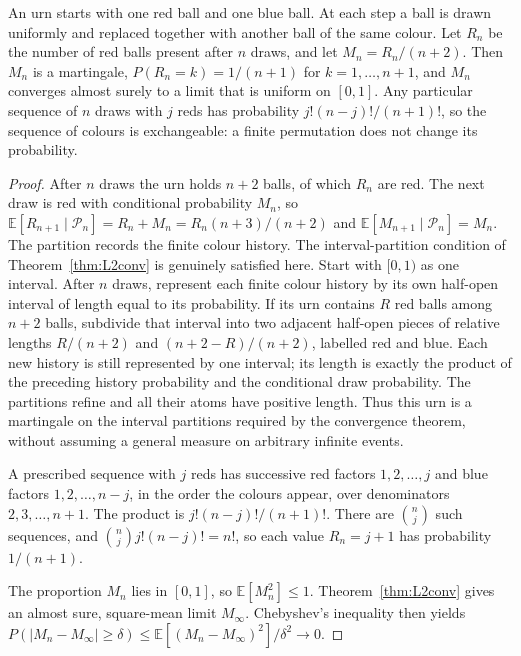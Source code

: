 \begin{theorem}\label{thm:polyaurn}
An urn starts with one red ball and one blue ball. At each step a ball is drawn uniformly and replaced together with another ball of the same colour. Let $R_n$ be the number of red balls present after $n$ draws, and let $M_n=R_n/(n+2)$. Then $M_n$ is a martingale, $P(R_n=k)=1/(n+1)$ for $k=1,\ldots,n+1$, and $M_n$ converges almost surely to a limit that is uniform on $[0,1]$. Any particular sequence of $n$ draws with $j$ reds has probability $j!(n-j)!/(n+1)!$, so the sequence of colours is exchangeable: a finite permutation does not change its probability.
\end{theorem}
\begin{proof}
After $n$ draws the urn holds $n+2$ balls, of which $R_n$ are red. The next draw is red with conditional probability $M_n$, so $\mathbb E[R_{n+1}\mid\mathcal P_n]=R_n+M_n=R_n(n+3)/(n+2)$ and $\mathbb E[M_{n+1}\mid\mathcal P_n]=M_n$. The partition records the finite colour history. The interval-partition condition of Theorem~\ref{thm:L2conv} is genuinely satisfied here. Start with $[0,1)$ as one interval. After $n$ draws, represent each finite colour history by its own half-open interval of length equal to its probability. If its urn contains $R$ red balls among $n+2$ balls, subdivide that interval into two adjacent half-open pieces of relative lengths $R/(n+2)$ and $(n+2-R)/(n+2)$, labelled red and blue. Each new history is still represented by one interval; its length is exactly the product of the preceding history probability and the conditional draw probability. The partitions refine and all their atoms have positive length. Thus this urn is a martingale on the interval partitions required by the convergence theorem, without assuming a general measure on arbitrary infinite events.

A prescribed sequence with $j$ reds has successive red factors $1,2,\ldots,j$ and blue factors $1,2,\ldots,n-j$, in the order the colours appear, over denominators $2,3,\ldots,n+1$. The product is $j!(n-j)!/(n+1)!$. There are $\binom nj$ such sequences, and $\binom nj j!(n-j)!=n!$, so each value $R_n=j+1$ has probability $1/(n+1)$.

The proportion $M_n$ lies in $[0,1]$, so $\mathbb E[M_n^2]\le 1$. Theorem~\ref{thm:L2conv} gives an almost sure, square-mean limit $M_\infty$. Chebyshev's inequality then yields $P(|M_n-M_\infty|\ge\delta)\le\mathbb E[(M_n-M_\infty)^2]/\delta^2\to0$.


\end{proof}
